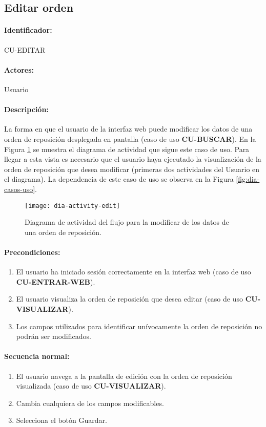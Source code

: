 \subsection{Editar orden}\label{cu-editar}
\paragraph{Identificador:}
CU-EDITAR
\paragraph{Actores:}
Usuario
\paragraph{Descripción:}
La forma en que el usuario de la interfaz web puede modificar los datos de una orden de reposición desplegada en pantalla (caso de uso \textbf{CU-BUSCAR}). En la Figura \ref{fig:dia-activity-edit} se muestra el diagrama de actividad que sigue este caso de uso. Para llegar a esta vista es necesario que el usuario haya ejecutado la visualización de la orden de reposición que desea modificar (primeras dos actividades del Usuario en el diagrama). La dependencia de este caso de uso se observa en la Figura \ref{fig:dia-casos-uso}.
\begin{figure}[h]
  \centering
  \texttt{[image: dia-activity-edit]}
  \caption{Diagrama de actividad del flujo para la modificar de los datos de una orden de reposición.}
  \label{fig:dia-activity-edit}
\end{figure}
\pagebreak
\paragraph{Precondiciones:}
\begin{enumerate}
  \item El usuario ha iniciado sesión correctamente en la interfaz web (caso de uso \textbf{CU-ENTRAR-WEB}).
  \item El usuario visualiza la orden de reposición que desea editar (caso de uso \textbf{CU-VISUALIZAR}).
  \item Los campos utilizados para identificar unívocamente la orden de reposición no podrán ser modificados. 
\end{enumerate}
\paragraph{Secuencia normal:}
\begin{enumerate}
  \item El usuario navega a la pantalla de edición con la orden de reposición visualizada (caso de uso \textbf{CU-VISUALIZAR}).
  \item Cambia cualquiera de los campos modificables.
  \item Selecciona el botón Guardar.
\end{enumerate}

